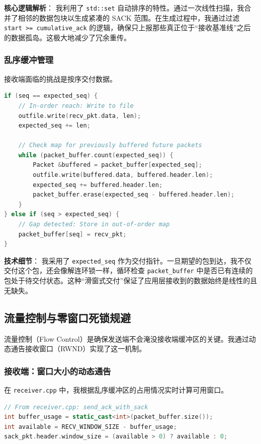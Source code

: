 \documentclass[UTF8,a4paper,10pt]{ctexart}
\begin{document}
\textbf{核心逻辑解析}：
我利用了 \texttt{std::set} 自动排序的特性。通过一次线性扫描，我合并了相邻的数据包块以生成紧凑的 SACK 范围。在生成过程中，我通过过滤 \texttt{start >= cumulative\_ack} 的逻辑，确保只上报那些真正位于“接收基准线”之后的数据孤岛。这极大地减少了冗余重传。

\subsubsection{乱序缓冲管理}
接收端面临的挑战是按序交付数据。

\begin{lstlisting}[language=C++]
if (seq == expected_seq) {
    // In-order reach: Write to file
    outfile.write(recv_pkt.data, len);
    expected_seq += len;

    // Check map for previously buffered future packets
    while (packet_buffer.count(expected_seq)) {
        Packet &buffered = packet_buffer[expected_seq];
        outfile.write(buffered.data, buffered.header.len);
        expected_seq += buffered.header.len;
        packet_buffer.erase(expected_seq - buffered.header.len);
    }
} else if (seq > expected_seq) {
    // Gap detected: Store in out-of-order map
    packet_buffer[seq] = recv_pkt;
}
\end{lstlisting}

\textbf{技术细节}：
我采用了 \texttt{expected\_seq} 作为交付指针。一旦期望的包到达，我不仅交付这个包，还会像解连环锁一样，循环检查 \texttt{packet\_buffer} 中是否已有连续的包处于待交付状态。这种“滑窗式交付”保证了应用层接收到的数据始终是线性的且无缺失。

\subsection{流量控制与零窗口死锁规避}

流量控制（Flow Control）是确保发送端不会淹没接收端缓冲区的关键。我通过动态通告接收窗口（RWND）实现了这一机制。

\subsubsection{接收端：窗口大小的动态通告}
在 \texttt{receiver.cpp} 中，我根据乱序缓冲区的占用情况实时计算可用窗口。

\begin{lstlisting}[language=C++]
// From receiver.cpp: send_ack_with_sack
int buffer_usage = static_cast<int>(packet_buffer.size());
int available = RECV_WINDOW_SIZE - buffer_usage;
sack_pkt.header.window_size = (available > 0) ? available : 0;
\end{lstlisting}
\end{document}
